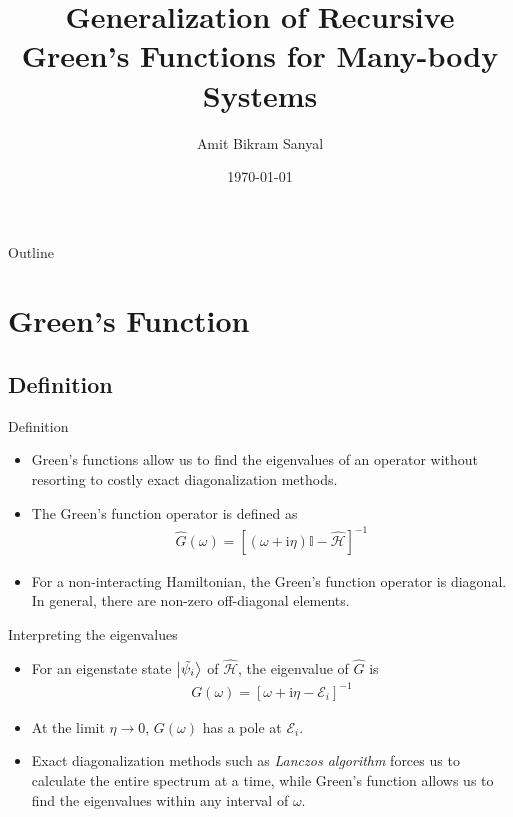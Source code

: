 \documentclass{beamer}
\title{Generalization of Recursive Green's Functions for Many-body Systems}
\author{Amit Bikram Sanyal\inst{1}}
\institute[] %
{
  \inst{1}%
  School of Physical Sciences\\
  National Institute of Science Education and Research
 }
\date{\today}
\newcommand{\I}{\mathrm{i}}
\newcommand{\ham}{\hat{\mathcal{H}}}
\begin{document}
\begin{frame}
  \titlepage
\end{frame}

\begin{frame}{Outline}
  \tableofcontents[pausesections]
\end{frame}

\section{Green's Function}
\subsection{Definition}
\begin{frame}{Definition}
	\begin{itemize}
		\item{
			Green's functions allow us to find the eigenvalues of an operator without resorting to costly exact diagonalization methods.
			}
		\item{ 
			The Green's function operator is defined as\,\cite{coleman_2015}
			\begin{align}\label{eqn:gf-def}
				\hat{G}\left(\omega\right) = \left[ \left( \omega + \I \eta\right) \mathbb{I} - \ham \right]^{-1}
			\end{align}
			}
		\item{
			For a non-interacting Hamiltonian, the Green's function operator is diagonal. In general, there are non-zero off-diagonal elements.
		}
	\end{itemize}
\end{frame}

\begin{frame}{Interpreting the eigenvalues}
	\begin{itemize}
		\item{
		For an eigenstate state $ \ket{\tilde{\psi_i}} $ of $ \ham $, the eigenvalue of $ \hat{G} $ is
		\begin{align}
		G\left(\omega\right) = \left[ \omega + \I \eta - \mathcal{E}_i \right]^{-1}
		\end{align}
		}
		\item {
		At the limit $ \eta \rightarrow 0 $, $ G(\omega) $ has a pole at $ \mathcal{E}_{i} $.
		}
		\item {
			Exact diagonalization methods such as \textit{Lanczos algorithm} forces us to calculate the entire spectrum at a time, while Green's function allows us to find the eigenvalues within any interval of $\omega$.
		}
	\end{itemize}
\end{frame}
\end{document}
